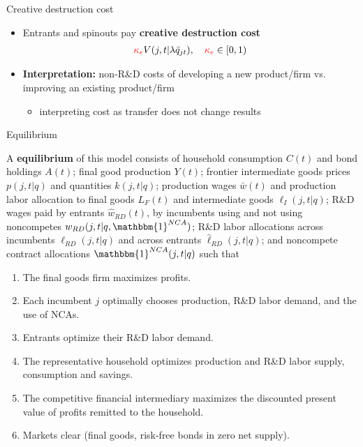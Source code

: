 \documentclass[english,usenames,dvipsnames]{beamer}
\begin{document}
\begin{frame}{Creative destruction cost}
	\begin{itemize}
		\item Entrants and spinouts pay \alert{\textbf{creative destruction cost}}
		\begin{align*}
			\textcolor{red}{\kappa_e} V(j,t|\lambda \bar{q}_{jt}), \quad \textcolor{red}{\kappa_e} \in [0,1)
		\end{align*}
		\smallskip
		\item \alert{\textbf{Interpretation:}} non-R\&D costs of developing a new product/firm vs. improving an existing product/firm 
		\begin{itemize}
			\item interpreting cost as transfer does not change results
		\end{itemize}
	\end{itemize}
\end{frame}


\begin{frame}{Equilibrium}\label{definition:equilibrium}
	\hyperlink{model:firm_ownership}{}
\begin{definition}
	\tiny
	A \textbf{equilibrium} of this model consists of household consumption $C(t)$ and bond holdings $A(t)$; final good production $Y(t)$; frontier intermediate goods prices $p(j,t|q)$ and quantities $k(j,t|q)$; production wages $\bar{w}(t)$ and production labor allocation to final goods $L_{F}(t)$ and intermediate goods $\ell_I(j,t|q)$; R\&D wages paid by entrants $\hat{w}_{RD}(t)$, by incumbents using and not using noncompetes $w_{RD}(j,t|q,\mathbbm{1}^{NCA})$; R\&D labor allocations across incumbents $\ell_{RD}(j,t|q)$ and across entrants $\hat{\ell}_{RD}(j,t|q)$; and noncompete contract allocations $\mathbbm{1}^{NCA}(j,t|q)$ such that 
	\begin{enumerate}
		\item The final goods firm maximizes profits.
		\item Each incumbent $j$ optimally chooses production, R\&D labor demand, and the use of NCAs.
		\item Entrants optimize their R\&D labor demand.
		\item The representative household optimizes production and R\&D labor supply, consumption and savings.
		\item The competitive financial intermediary maximizes the discounted present value of profits remitted to the household.
		\item Markets clear (final goods, risk-free bonds in zero net supply).
	\end{enumerate}
\end{definition}
\end{frame}
\end{document}
